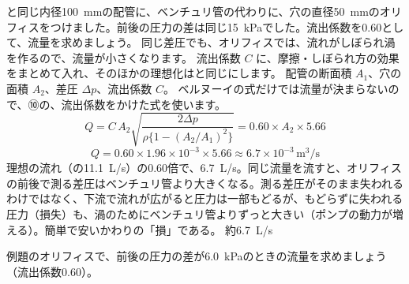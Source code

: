 \begin{phreidai}[オリフィス流量計]
\label{ph:力-13:ex8}と同じ内径\qty{100}{mm}の配管に、ベンチュリ管の代わりに、穴の直径\qty{50}{mm}のオリフィスをつけました。前後の圧力の差は同じ\qty{15}{kPa}でした。流出係数を0.60として、流量を求めましょう。
\phbamen
同じ差圧でも、オリフィスでは、流れがしぼられ渦を作るので、流量が小さくなります。
\phmushi
流出係数 $C$ に、摩擦・しぼられ方の効果をまとめて入れ、そのほかの理想化はと同じにします。
\phzu
配管の断面積 $A_1$、穴の面積 $A_2$、差圧 $\Delta p$、流出係数 $C$。
\phriyu
ベルヌーイの式だけでは流量が決まらないので、⑩の、流出係数をかけた式を使います。
\phtateru
\[ Q=C\,A_2\sqrt{\frac{2\Delta p}{\rho\{1-(A_2/A_1)^2\}}}=0.60\times A_2\times5.66 \]
\phtoku
\[ Q=0.60\times1.96\times10^{-3}\times5.66\approx6.7\times10^{-3}\,\mathrm{m^3/s} \]
\phtashikame
理想の流れ（\nobreak{}の\qty{11.1}{L/s}）の0.60倍で、\qty{6.7}{L/s}。同じ流量を流すと、オリフィスの前後で測る差圧はベンチュリ管より大きくなる。測る差圧がそのまま失われるわけではなく、下流で流れが広がると圧力は一部もどるが、もどらずに失われる圧力（損失）も、渦のためにベンチュリ管よりずっと大きい（ポンプの動力が増える）。簡単で安いかわりの「損」である。
\kotae 約\qty{6.7}{L/s}
\end{phreidai}
\begin{jibun}
例題のオリフィスで、前後の圧力の差が\qty{6.0}{kPa}のときの流量を求めましょう（流出係数0.60）。
\end{jibun}

